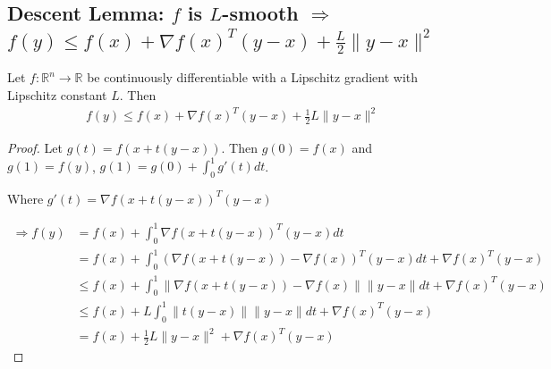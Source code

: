 \documentclass[11pt]{elegantbook}
\begin{document}
\subsection{Descent Lemma: $f$ is $L$-smooth $\Rightarrow$ $f(y)\leq f(x)+\nabla f(x)^T(y-x)+\frac{L}{2}\|y-x\|^2$}
\begin{lemma}
Let $f: \mathbb{R}^n \rightarrow \mathbb{R}$ be continuously differentiable with a Lipschitz gradient with Lipschitz constant $L$. Then
\begin{equation}
    \begin{aligned}
        f(y)\leq f(x)+\nabla f(x)^T(y-x)+\frac{1}{2}L\|y-x\|^2
    \end{aligned}
    \nonumber
\end{equation}
\end{lemma}
\begin{proof}
Let $g(t)=f(x+t(y-x))$. Then $g(0)=f(x)$ and $g(1)=f(y)$, $g(1)=g(0)+\int_0^1g'(t)dt$.

Where $g'(t)=\nabla f(x+t(y-x))^T(y-x)$

\begin{equation}
    \begin{aligned}
        \Rightarrow	f(y)&=f(x)+\int_0^1\nabla f(x+t(y-x))^T(y-x)dt\\
        &=f(x)+\int_0^1(\nabla f(x+t(y-x))-\nabla f(x))^T(y-x)dt+\nabla f(x)^T(y-x)\\
        &\leq f(x)+\int_0^1\|\nabla f(x+t(y-x))-\nabla f(x)\|\|y-x\|dt+\nabla f(x)^T(y-x)\\
        &\leq f(x)+L\int_0^1\|t(y-x)\|\|y-x\|dt+\nabla f(x)^T(y-x)\\
        &=f(x)+\frac{1}{2}L\|y-x\|^2+\nabla f(x)^T(y-x)
    \end{aligned}
    \nonumber
\end{equation}
\end{proof}
\end{document}
